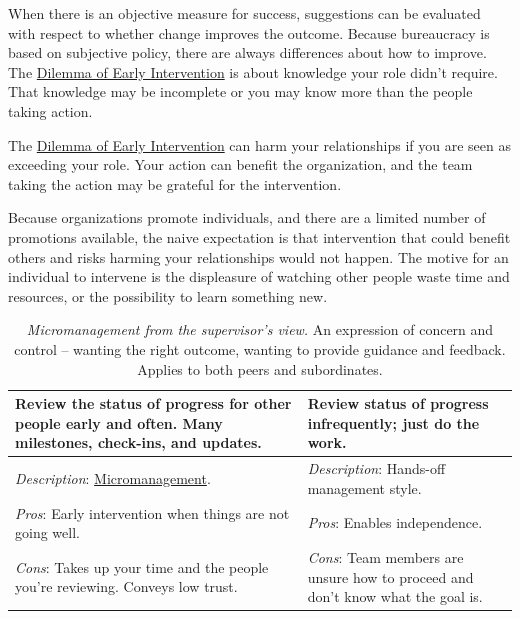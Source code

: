 When there is an objective measure for success, suggestions can be evaluated with respect to whether change improves the outcome. Because bureaucracy is based on subjective policy, there are always differences about how to improve. The \href{table:early-intervention}{Dilemma of Early Intervention} is about knowledge your role didn't require. That knowledge may be incomplete or you may know more than the people taking action. 


The \href{table:early-intervention}{Dilemma of Early Intervention} can harm your relationships if you are seen as exceeding your role. Your action can benefit the organization, and the team taking the action may be grateful for the intervention. 

Because organizations promote individuals, and there are a limited number of promotions available, the naive expectation is that intervention that could benefit others and risks harming your relationships would not happen. The motive for an individual to intervene is the displeasure of watching other people waste time and resources, or the possibility to learn something new.


\begin{center}
\begin{table}[H] %
\begin{tabular}{ | m{\dilemmatablewidth}| m{\dilemmatablewidth} | } 
  \hline
  \textbf{Review the status of progress for other people early and often. Many milestones, check-ins, and updates.} &
  \textbf{Review status of progress infrequently; just do the work.} \\
  \hline
  \textit{Description}: \href{https://en.wikipedia.org/wiki/Micromanagement}{Micromanagement}. & 
  \textit{Description}: Hands-off management style. \\
  \hline
  \textit{Pros}: Early intervention when things are not going well. & 
  \textit{Pros}: Enables independence. \\
  \hline
  \textit{Cons}: Takes up your time and the people you're reviewing. Conveys low trust. & 
  \textit{Cons}: Team members are unsure how to proceed and don't know what the goal is. \\
  \hline
\end{tabular}
\caption{\textit{Micromanagement from the supervisor's view.}
An expression of concern and control -- wanting the right outcome, wanting to provide guidance and feedback. Applies to both peers and subordinates.}
\label{table:micromanaging}
\end{table}
\end{center}


